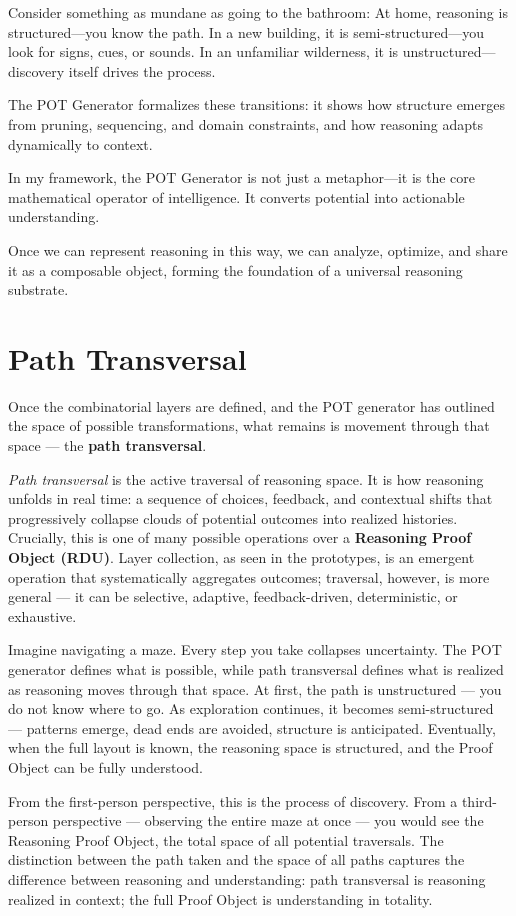 \documentclass[11pt]{article}
\begin{document}
Consider something as mundane as going to the bathroom:  
At home, reasoning is structured---you know the path.  
In a new building, it is semi-structured---you look for signs, cues, or sounds.  
In an unfamiliar wilderness, it is unstructured---discovery itself drives the process.

The POT Generator formalizes these transitions: it shows how structure emerges from pruning, sequencing, and domain constraints, and how reasoning adapts dynamically to context.

In my framework, the POT Generator is not just a metaphor---it is the core mathematical operator of intelligence. It converts potential into actionable understanding.

Once we can represent reasoning in this way, we can analyze, optimize, and share it as a composable object, forming the foundation of a universal reasoning substrate.

\section{Path Transversal}

Once the combinatorial layers are defined, and the POT generator has outlined the space of possible transformations, what remains is movement through that space --- the \textbf{path transversal}.

\textit{Path transversal} is the active traversal of reasoning space. It is how reasoning unfolds in real time: a sequence of choices, feedback, and contextual shifts that progressively collapse clouds of potential outcomes into realized histories. Crucially, this is one of many possible operations over a \textbf{Reasoning Proof Object (RDU)}. Layer collection, as seen in the prototypes, is an emergent operation that systematically aggregates outcomes; traversal, however, is more general --- it can be selective, adaptive, feedback-driven, deterministic, or exhaustive.

Imagine navigating a maze. Every step you take collapses uncertainty. The POT generator defines what is possible, while path transversal defines what is realized as reasoning moves through that space. At first, the path is unstructured --- you do not know where to go. As exploration continues, it becomes semi-structured --- patterns emerge, dead ends are avoided, structure is anticipated. Eventually, when the full layout is known, the reasoning space is structured, and the Proof Object can be fully understood.

From the first-person perspective, this is the process of discovery. From a third-person perspective --- observing the entire maze at once --- you would see the Reasoning Proof Object, the total space of all potential traversals. The distinction between the path taken and the space of all paths captures the difference between reasoning and understanding: path transversal is reasoning realized in context; the full Proof Object is understanding in totality.
\end{document}
